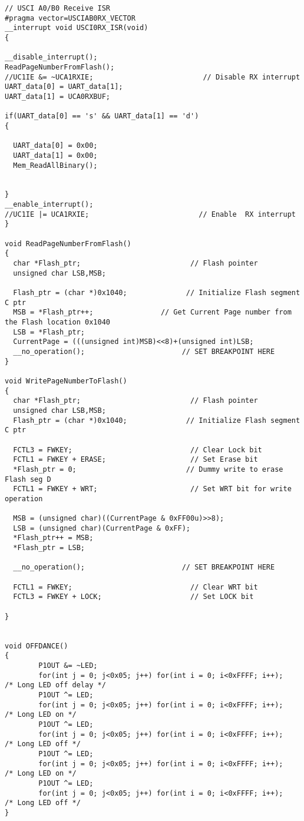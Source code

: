 \begin{lstlisting}[caption=Main.c,label=Code4]
// USCI A0/B0 Receive ISR
#pragma vector=USCIAB0RX_VECTOR
__interrupt void USCI0RX_ISR(void)
{
  
__disable_interrupt();
ReadPageNumberFromFlash();
//UC1IE &= ~UCA1RXIE;                          // Disable RX interrupt
UART_data[0] = UART_data[1];
UART_data[1] = UCA0RXBUF;

if(UART_data[0] == 's' && UART_data[1] == 'd')
{
  
  UART_data[0] = 0x00;
  UART_data[1] = 0x00;
  Mem_ReadAllBinary();
  
  
}
__enable_interrupt();
//UC1IE |= UCA1RXIE;                          // Enable  RX interrupt
}

void ReadPageNumberFromFlash()
{
  char *Flash_ptr;                          // Flash pointer
  unsigned char LSB,MSB;
  
  Flash_ptr = (char *)0x1040;              // Initialize Flash segment C ptr
  MSB = *Flash_ptr++;                // Get Current Page number from the Flash location 0x1040
  LSB = *Flash_ptr;
  CurrentPage = (((unsigned int)MSB)<<8)+(unsigned int)LSB;
  __no_operation();                       // SET BREAKPOINT HERE
}

void WritePageNumberToFlash()
{
  char *Flash_ptr;                          // Flash pointer
  unsigned char LSB,MSB;
  Flash_ptr = (char *)0x1040;              // Initialize Flash segment C ptr
  
  FCTL3 = FWKEY;                            // Clear Lock bit
  FCTL1 = FWKEY + ERASE;                    // Set Erase bit
  *Flash_ptr = 0;                          // Dummy write to erase Flash seg D
  FCTL1 = FWKEY + WRT;                      // Set WRT bit for write operation
  
  MSB = (unsigned char)((CurrentPage & 0xFF00u)>>8);
  LSB = (unsigned char)(CurrentPage & 0xFF);
  *Flash_ptr++ = MSB;
  *Flash_ptr = LSB;
  
  __no_operation();                       // SET BREAKPOINT HERE
  
  FCTL1 = FWKEY;                            // Clear WRT bit
  FCTL3 = FWKEY + LOCK;                     // Set LOCK bit
  
}


void OFFDANCE()
{
        P1OUT &= ~LED;
        for(int j = 0; j<0x05; j++) for(int i = 0; i<0xFFFF; i++);        /* Long LED off delay */
        P1OUT ^= LED;
        for(int j = 0; j<0x05; j++) for(int i = 0; i<0xFFFF; i++);        /* Long LED on */
        P1OUT ^= LED;
        for(int j = 0; j<0x05; j++) for(int i = 0; i<0xFFFF; i++);        /* Long LED off */
        P1OUT ^= LED;
        for(int j = 0; j<0x05; j++) for(int i = 0; i<0xFFFF; i++);        /* Long LED on */
        P1OUT ^= LED;
        for(int j = 0; j<0x05; j++) for(int i = 0; i<0xFFFF; i++);        /* Long LED off */  
}



\end{lstlisting}
